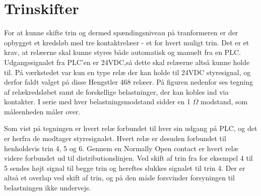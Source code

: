 

\section{Trinskifter}
For at kunne skifte trin og dermed spændingsniveau på tranformeren er der opbygget et kredsløb med tre kontaktrelæer - et for hvert muligt trin. Det er et krav, at relæerne skal kunne styres både automatisk og manuelt fra en PLC. Udgangssignalet fra PLC'en er 24VDC,så dette skal relæerne altså kunne holde til. På værkstedet var kun en type relæ der kan holde til 24VDC styresignal, og derfor faldt valget på disse Hengstler 468 relæer. På figuren nedenfor ses tegning af relækredsløbet samt de forskellige belastninger, der kan kobles ind via kontakter. I serie med hver belastningsmodstand sidder en 1 $\Omega$ modstand, som måleenheden måler over. 


Som vist på tegningen er hvert relæ forbundet til hver sin udgang på PLC, og det er herfra de modtager styresignalet. Hvert relæ er desuden forbundet til henholdsvis trin 4, 5 og 6. Gennem en Normally Open contact er hvert relæ videre forbundet ud til distributionslinjen. Ved skift af trin fra for eksempel 4 til 5 sendes højt signal til begge trin og hereftes slukkes signalet til trin 4. Der er altså et overlap ved skift af trin, og på den måde forsvinder forsyningen til belastningen ikke undervejs. 